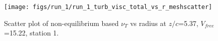 \begin{figure}[H]
\centering
\texttt{[image: figs/run\_1/run\_1\_turb\_visc\_total\_vs\_r\_meshscatter]}
\caption{Scatter plot of non-equilibrium based $\nu_T$ vs radius at $z/c$=5.37, $V_{free}$=15.22, station 1.}
\label{fig:run_1_turb_visc_total_vs_r_meshscatter}
\end{figure}


